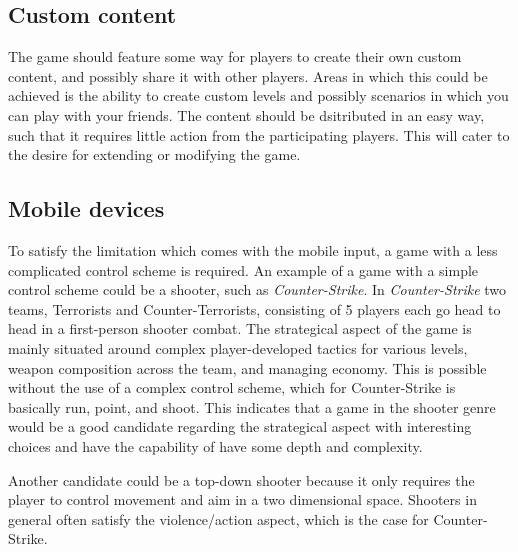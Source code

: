 \subsection{Custom content}\label{sec:selectionofgametype:customcontent}
The game should feature some way for players to create their own custom content, and possibly share it with other players. Areas in which this could be achieved is the ability to create custom levels and possibly scenarios in which you can play with your friends. The content should be dsitributed in an easy way, such that it requires little action from the participating players.
This will cater to the desire for extending or modifying the game.

\subsection{Mobile devices}\label{sec:selectionofgametype:mobiledevices}
To satisfy the limitation which comes with the mobile input, a game with a less complicated control scheme is required.
An example of a game with a simple control scheme could be a shooter, such as \textit{Counter-Strike}.\cite{counterstrike}
In \textit{Counter-Strike} two teams, Terrorists and Counter-Terrorists,
consisting of 5 players each go head to head in a first-person shooter combat.
The strategical aspect of the game is mainly situated around complex
player-developed tactics for various levels, weapon composition across the
team, and managing economy. This is possible without the use of a complex
control scheme, which for Counter-Strike is basically run, point, and shoot.
This indicates that a game in the shooter genre would
be a good candidate regarding the strategical aspect with interesting choices
and have the capability of have some depth and complexity.

Another candidate could be a top-down shooter because it only requires the
player to control movement and aim in a two dimensional space. Shooters in
general often satisfy the violence/action aspect, which is the case for
Counter-Strike.

